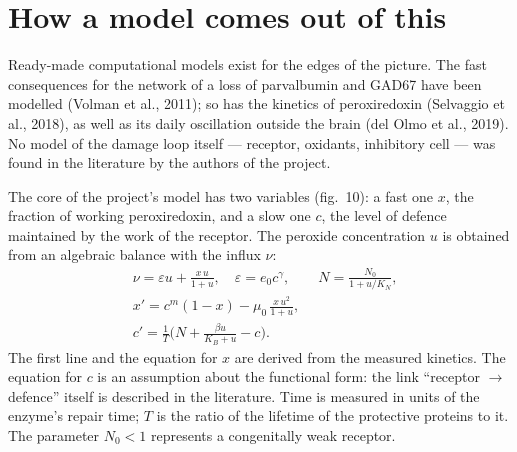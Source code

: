 \section{How a model comes out of this}
Ready-made computational models exist for the edges of the picture. The fast consequences for the network of a loss of parvalbumin and GAD67 have been modelled (Volman et al., 2011); so has the kinetics of peroxiredoxin (Selvaggio et al., 2018), as well as its daily oscillation outside the brain (del Olmo et al., 2019). No model of the damage loop itself --- receptor, oxidants, inhibitory cell --- was found in the literature by the authors of the project.\tS

The core of the project's model has two variables (fig.~10): a fast one $x$, the fraction of working peroxiredoxin, and a slow one $c$, the level of defence maintained by the work of the receptor. The peroxide concentration $u$ is obtained from an algebraic balance with the influx $\nu$:
\begin{align*}
&\nu = \varepsilon u + \frac{x\,u}{1+u},\quad \varepsilon = e_0 c^{\gamma},\qquad N = \frac{N_0}{1 + u/K_N},\\
&x' = c^{m}(1 - x) - \mu_0\,\frac{x\,u^2}{1+u},\\
&c' = \frac{1}{T}\Big(N + \frac{\beta u}{K_B + u} - c\Big).
\end{align*}
The first line and the equation for $x$ are derived from the measured kinetics. The equation for $c$ is an assumption about the functional form: the link ``receptor $\to$ defence'' itself is described in the literature. Time is measured in units of the enzyme's repair time; $T$ is the ratio of the lifetime of the protective proteins to it. The parameter $N_0 < 1$ represents a congenitally weak receptor.
